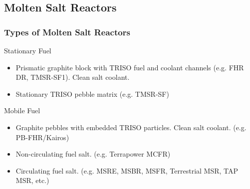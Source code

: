 \subsection{Molten Salt Reactors}

\begin{frame}
        \frametitle{Types of Molten Salt Reactors}
        \begin{block}{Stationary Fuel}
                \begin{itemize}
                        \item Prismatic graphite block with TRISO fuel and 
                                coolant channels (e.g. FHR DR, TMSR-SF1). Clean salt 
                                coolant.
                        \item Stationary TRISO pebble matrix (e.g. TMSR-SF)
                \end{itemize}

        \end{block}
        \begin{block}{Mobile Fuel}
                \begin{itemize}
                        \item Graphite pebbles with embedded TRISO particles. 
                                Clean salt coolant. (e.g. PB-FHR/Kairos)
                        \item Non-circulating fuel salt. (e.g. Terrapower MCFR)
                        \item Circulating fuel salt. (e.g. MSRE, MSBR, MSFR, 
                                Terrestrial MSR, TAP MSR, etc.)
                \end{itemize}
        \end{block}
\end{frame}

